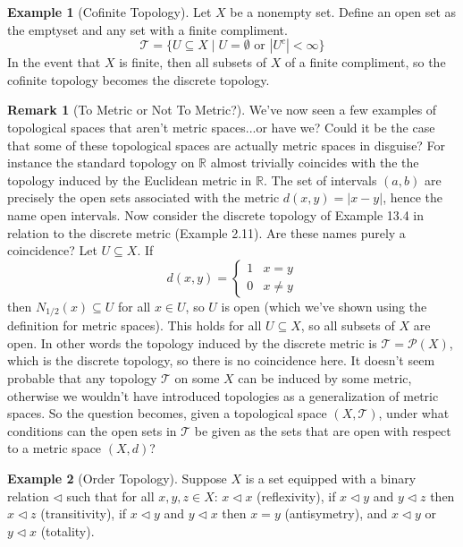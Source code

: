 \documentclass{article}
\newcommand{\R}{\mathbb{R}}
\newcommand{\T}{\mathcal{T}}
\theoremstyle{definition}
\newtheorem{example}{Example}[section]
\newtheorem{remark}{Remark}[section]
\begin{document}
	\begin{example}[Cofinite Topology]
		Let $X$ be a nonempty set. Define an open set as the emptyset and any set with a finite compliment. 
		$$ \T = \{U\subseteq X\mid U = \emptyset\text{ or }|U^c|<\infty\}$$
		In the event that $X$ is finite, then all subsets of $X$ of a finite compliment, so the cofinite topology becomes the discrete topology.  
	\end{example}

	\begin{remark}[To Metric or Not To Metric?]
		We've now seen a few examples of topological spaces that aren't metric spaces...or have we? Could it be the case that some of these topological spaces are actually metric spaces in disguise? For instance the standard topology on $\R$ almost trivially coincides with the the topology induced by the Euclidean metric in $\R$. The set of intervals $(a,b)$ are precisely the open sets associated with the metric $d(x,y)=|x-y|$, hence the name open intervals. Now consider the discrete topology of Example 13.4 in relation to the discrete metric (Example 2.11). Are these names purely a coincidence? Let $U\subseteq X$. If
		$$d(x,y)=\begin{cases}
			1 & x=y\\
			0 & x\neq y
		\end{cases} $$
		then $N_{1/2}(x)\subseteq U$ for all $x\in U$, so $U$ is open (which we've shown using the definition for metric spaces). This holds for all $U\subseteq X$, so all subsets of $X$ are open. In other words the topology induced by the discrete metric is $\T=\mathcal P(X)$, which is the discrete topology, so there is no coincidence here. It doesn't seem probable that any topology $\T$ on some $X$ can be induced by some metric, otherwise we wouldn't have introduced topologies as a generalization of metric spaces. So the question becomes, given a topological space $(X,\T)$, under what conditions can the open sets in $\T$ be given as the sets that are open with respect to a metric space $(X,d)$?
	\end{remark}






	\begin{example}[Order Topology]
		Suppose $X$ is a set equipped with a binary relation $\lhd$ such that for all $x,y,z\in X$: $x\lhd x$ (reflexivity), if $x\lhd y$ and $y\lhd z$ then $x\lhd z$ (transitivity), if $x\lhd y$ and $y\lhd x$ then $x=y$ (antisymetry), and $x\lhd y$ or $y\lhd x$ (totality). 
	\end{example}
\end{document}
